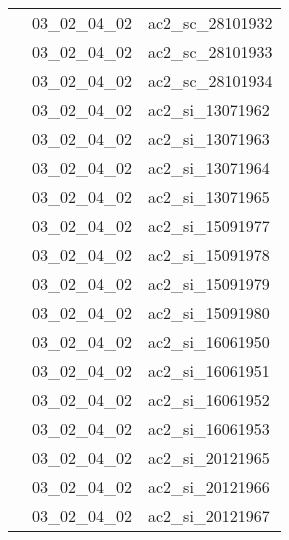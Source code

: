 \documentclass[12pt,titlepage,oneside]{book}
\begin{document}
\begin{supertabular}{|p{10cm}|c|p{15cm}|}
                    & 03\_02\_04\_02 & ac2\_sc\_28101932\\


                    & 03\_02\_04\_02 & ac2\_sc\_28101933\\


                    & 03\_02\_04\_02 & ac2\_sc\_28101934\\


                    & 03\_02\_04\_02 & ac2\_si\_13071962\\


                    & 03\_02\_04\_02 & ac2\_si\_13071963\\


                    & 03\_02\_04\_02 & ac2\_si\_13071964\\


                    & 03\_02\_04\_02 & ac2\_si\_13071965\\


                    & 03\_02\_04\_02 & ac2\_si\_15091977\\


                    & 03\_02\_04\_02 & ac2\_si\_15091978\\


                    & 03\_02\_04\_02 & ac2\_si\_15091979\\


                    & 03\_02\_04\_02 & ac2\_si\_15091980\\


                    & 03\_02\_04\_02 & ac2\_si\_16061950\\


                    & 03\_02\_04\_02 & ac2\_si\_16061951\\


                    & 03\_02\_04\_02 & ac2\_si\_16061952\\


                    & 03\_02\_04\_02 & ac2\_si\_16061953\\


                    & 03\_02\_04\_02 & ac2\_si\_20121965\\


                    & 03\_02\_04\_02 & ac2\_si\_20121966\\


                    & 03\_02\_04\_02 & ac2\_si\_20121967\\



\end{supertabular}
\end{document}
